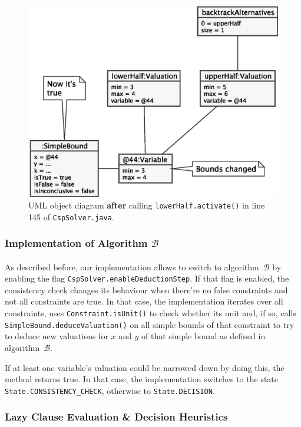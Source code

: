 \begin{figure}[H]
    \centering
    \includegraphics[width=.7\textwidth]{images/valuation-after}
    \caption{UML object diagram \textbf{after} calling \texttt{lowerHalf.activate()} in line 145 of \texttt{CspSolver.java}.}
    \label{fig:valuation-after}
\end{figure}


\subsubsection{Implementation of Algorithm $\mathcal{B}$}

\paragraph{}
As described before, our implementation allows to switch to algorithm~$\mathcal{B}$ by enabling the flag \texttt{CspSolver.enableDeductionStep}.
If that flag is enabled, the consistency check changes its behaviour when there're no false constraints and not all constraints are true.
In that case, the implementation iterates over all constraints, uses \texttt{Constraint.isUnit()} to check whether its unit and, if so, calls \texttt{SimpleBound.deduceValuation()} on all simple bounds of that constraint to try to deduce new valuations for $x$ and $y$ of that simple bound as defined in algorithm~$\mathcal{B}$.

If at least one variable's valuation could be narrowed down by doing this, the method returns true.
In that case, the implementation switches to the state \texttt{State.CONSISTENCY\_CHECK}, otherwise to \texttt{State.DECISION}.


\subsubsection{Lazy Clause Evaluation \& Decision Heuristics}

